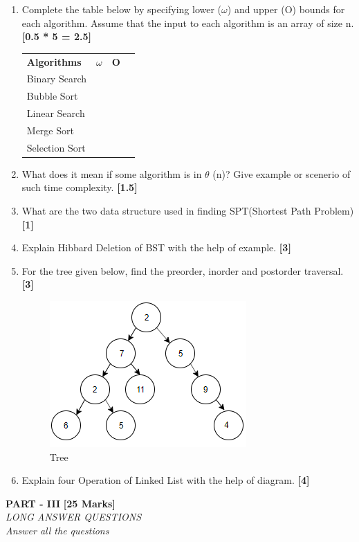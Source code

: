 \documentclass[12pt ,a4paper]{exam}
\begin{document}
	\begin{enumerate}[start=1,label={\bfseries Q\arabic*)}]
		\item Complete the table below by specifying lower ($\omega$) and upper (O) bounds for each algorithm. Assume that the input to each algorithm is an array of size n.  \hfill \textbf{ [0.5 * 5 = 2.5]}
		
		\begin{table}[h]
			\centering
			\begin{tabular}{|l|l|l|l}
				\cline{1-3}
				\textbf{Algorithms} & \textbf{$\omega$} & \textbf{O}  &  \\ \cline{1-3}
				Binary Search &   &     &  \\ \cline{1-3}
				Bubble Sort&   &     &  \\ \cline{1-3}
				Linear Search&   &     &  \\ \cline{1-3}
				Merge Sort&    &     &  \\ \cline{1-3}
				Selection Sort &   &     &  \\ \cline{1-3}
			\end{tabular}
		\end{table}
		\item What does it mean if some algorithm is in $\theta$ (n)? Give example or scenerio of such time complexity. \hfill \textbf{[1.5]}
		\item What are the two data structure used in finding SPT(Shortest Path Problem) \hfill \textbf{[1]}
		\item Explain Hibbard Deletion of BST with the help of example. \hfill \textbf{[3]}
	    \item For the tree given below, find the preorder, inorder and postorder traversal. \hfill \textbf{[3]}
	    \begin{figure} [h]
	    	\centering
	    	\includegraphics[width=0.4\linewidth]{"Screenshot 2020-12-26 at 9.29.16 AM"}
	    	\caption{Tree}
	    	\label{fig:screenshot-2020-12-26-at-9}
	    \end{figure}
	     \item Explain four Operation of Linked List with the help of diagram. \hfill \textbf{[4]}
	   
	\end{enumerate}
	\pagebreak
	\begin{center}
		\textbf{PART - III} \textbf{[25 Marks]}\\
		\noindent \textit{LONG ANSWER QUESTIONS} \\
		\noindent \textit{Answer all the questions}  
	\end{center}
	
\end{document}
